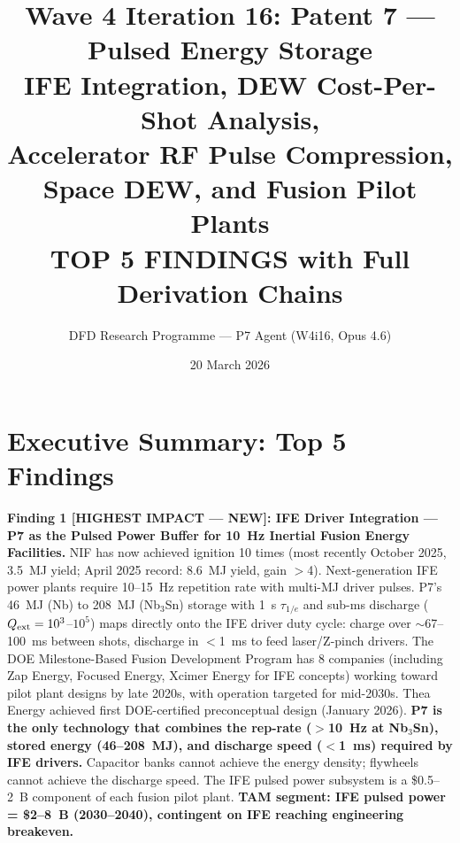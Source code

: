 \documentclass[11pt]{article}
\title{Wave 4 Iteration 16: Patent 7 --- Pulsed Energy Storage\\
\large IFE Integration, DEW Cost-Per-Shot Analysis,\\
Accelerator RF Pulse Compression, Space DEW, and Fusion Pilot Plants\\[4pt]
{\normalsize TOP 5 FINDINGS with Full Derivation Chains}}
\author{DFD Research Programme --- P7 Agent (W4i16, Opus 4.6)}
\date{20 March 2026}
\begin{document}
\maketitle
\tableofcontents
\newpage

\section*{Executive Summary: Top 5 Findings}

\begin{tcolorbox}[colback=blue!5!white, colframe=blue!60!black,
  title=\textbf{W4i16 P7 --- Top 5 Findings (Ranked by Impact)}]

\textbf{Finding 1 [HIGHEST IMPACT --- NEW]: IFE Driver Integration ---
P7 as the Pulsed Power Buffer for 10~Hz Inertial Fusion Energy
Facilities.}
NIF has now achieved ignition 10 times (most recently October 2025,
3.5~MJ yield; April 2025 record: 8.6~MJ yield, gain $>$4).
Next-generation IFE power plants require 10--15~Hz repetition rate
with multi-MJ driver pulses. P7's 46~MJ (Nb) to 208~MJ (Nb$_3$Sn)
storage with 1~s $\tau_{1/e}$ and sub-ms discharge ($Q_{\rm ext}
= 10^3$--$10^5$) maps directly onto the IFE driver duty cycle:
charge over $\sim$67--100~ms between shots, discharge in
$<$1~ms to feed laser/Z-pinch drivers. The DOE Milestone-Based
Fusion Development Program has 8 companies (including Zap Energy,
Focused Energy, Xcimer Energy for IFE concepts) working toward
pilot plant designs by late 2020s, with operation targeted for
mid-2030s. Thea Energy achieved first DOE-certified preconceptual
design (January 2026). \textbf{P7 is the only technology that
combines the rep-rate ($>$10~Hz at Nb$_3$Sn), stored energy
(46--208~MJ), and discharge speed ($<$1~ms) required by IFE
drivers.} Capacitor banks cannot achieve the energy density;
flywheels cannot achieve the discharge speed. The IFE pulsed
power subsystem is a \$0.5--2~B component of each fusion pilot
plant. \textbf{TAM segment: IFE pulsed power = \$2--8~B
(2030--2040), contingent on IFE reaching engineering breakeven.}


\end{tcolorbox}
\end{document}
